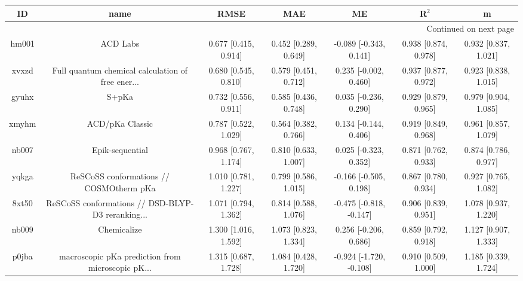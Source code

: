 \documentclass{article}
\begin{document}
\begin{center}
\begin{longtable}{|ccccccc|}
\toprule
    ID &                                               name &                    RMSE &                    MAE &                        ME &                 R$^2$ &                       m \\
\midrule
\endhead
\midrule
\multicolumn{7}{r}{{Continued on next page}} \\
\midrule
\endfoot

\bottomrule
\endlastfoot
 hm001 &                                           ACD Labs &    0.677 [0.415, 0.914] &   0.452 [0.289, 0.649] &    -0.089 [-0.343, 0.141] &  0.938 [0.874, 0.978] &    0.932 [0.837, 1.021] \\
 xvxzd &  Full quantum chemical calculation of free ener... &    0.680 [0.545, 0.810] &   0.579 [0.451, 0.712] &     0.235 [-0.002, 0.460] &  0.937 [0.877, 0.972] &    0.923 [0.838, 1.015] \\
 gyuhx &                                              S+pKa &    0.732 [0.556, 0.911] &   0.585 [0.436, 0.748] &     0.035 [-0.236, 0.290] &  0.929 [0.879, 0.965] &    0.979 [0.904, 1.085] \\
 xmyhm &                                    ACD/pKa Classic &    0.787 [0.522, 1.029] &   0.564 [0.382, 0.766] &     0.134 [-0.144, 0.406] &  0.919 [0.849, 0.968] &    0.961 [0.857, 1.079] \\
 nb007 &                                    Epik-sequential &    0.968 [0.767, 1.174] &   0.810 [0.633, 1.007] &     0.025 [-0.323, 0.352] &  0.871 [0.762, 0.933] &    0.874 [0.786, 0.977] \\
 yqkga &            ReSCoSS conformations // COSMOtherm pKa &    1.010 [0.781, 1.227] &   0.799 [0.586, 1.015] &    -0.166 [-0.505, 0.198] &  0.867 [0.780, 0.934] &    0.927 [0.765, 1.082] \\
 8xt50 &  ReSCoSS conformations // DSD-BLYP-D3 reranking... &    1.071 [0.794, 1.362] &   0.814 [0.588, 1.076] &   -0.475 [-0.818, -0.147] &  0.906 [0.839, 0.951] &    1.078 [0.937, 1.220] \\
 nb009 &                                        Chemicalize &    1.300 [1.016, 1.592] &   1.073 [0.823, 1.334] &     0.256 [-0.206, 0.686] &  0.859 [0.792, 0.918] &    1.127 [0.907, 1.333] \\
 p0jba &  macroscopic pKa prediction from microscopic pK... &    1.315 [0.687, 1.728] &   1.084 [0.428, 1.720] &   -0.924 [-1.720, -0.108] &  0.910 [0.509, 1.000] &    1.185 [0.339, 1.724] \\

\end{longtable}
\end{center}
\end{document}
